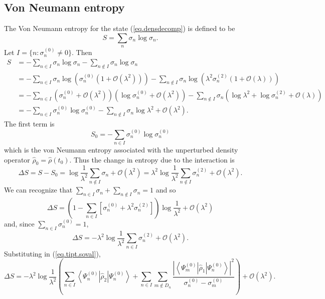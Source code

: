 \documentclass[11pt]{article}
\newcommand{\Od}[1]{\mathcal{O}{\left(#1\right)}}
\newcommand{\bra}[1]{\left\langle#1\right|}
\newcommand{\ket}[1]{\left|#1\right\rangle}
\newcommand{\op}[1]{\hat{#1}}
\theoremstyle{theorem}
\theoremstyle{remark}
\theoremstyle{step}
\theoremstyle{gap}
\begin{document}
\subsection{Von Neumann entropy}\label{sec.totalvonneumann}

The Von Neumann entropy for the state (\ref{eq.densdecomp}) is defined to be
\[
S = \sum_{n} \sigma_n \log \sigma_n.
\]
Let \(I = \{n : \sigma_n^{(0)} \neq 0\}\). Then
\begin{align*}
S &= -\sum_{n \in I} \sigma_n \log \sigma_n-\sum_{n \not\in I} \sigma_n \log \sigma_n \\
&= - \sum_{n \in I} \sigma_n \log \left(\sigma_n^{(0)} \left(1 + \Od{\lambda^2}\right)\right)  - \sum_{n \not\in I} \sigma_n \log\left(\lambda^2\sigma_n^{(2)}\left(1 + \Od{\lambda}\right)\right) \\
&= - \sum_{n \in I} \left(\sigma_n^{(0)} + \Od{\lambda^2}\right) \left(\log \sigma_n^{(0)}+\Od{\lambda^2}\right) - \sum_{n \not\in I} \sigma_n \left(\log\lambda^2+\log\sigma_n^{(2)}+ \Od{\lambda}\right) \\
&= - \sum_{n \in I} \sigma_n^{(0)} \log \sigma_n^{(0)} -\sum_{n \not\in I} \sigma_n \log\lambda^2+ \Od{\lambda^2}.
\end{align*}
The first term is
\[S_0 = - \sum_{n \in I} \sigma_n^{(0)} \log \sigma_n^{(0)}\]
which is the von Neumann entropy associated with the unperturbed density operator \(\op{\rho}_0 = \op{\rho}\left(t_0\right)\). Thus the change in entropy due to the interaction is
\begin{equation}\label{eq.entropyresultnotA}
{\Delta S = S-S_0 = \log\frac{1}{\lambda^2}\sum_{n \not\in I} \sigma_n + \Od{\lambda^2} = \lambda^2 \log\frac{1}{\lambda^2} \sum_{n \not\in I}\sigma_n^{(2)}+ \Od{\lambda^2}.}
\end{equation}
We can recognize that \(\sum_{n\in I} \sigma_n + \sum_{n \not\in I} \sigma_n = 1\) and so
\[
\Delta S = \left(1- \sum_{n\in I} \left[\sigma_n^{(0)}+\lambda^2 \sigma_n^{(2)}\right]\right)\log\frac{1}{\lambda^2} + \Od{\lambda^2}
\]
and, since \(\sum_{n \in I} \sigma_n^{(0)} = 1\),
\begin{equation}\label{eq.entropyresultwithsigma2}
{\Delta S = -\lambda^2 \log\frac{1}{\lambda^2}\sum_{n \in I} \sigma_n^{(2)} + \Od{\lambda^2}.}
\end{equation}
Substituting in (\ref{eq.tipt.soval}),
\[
\Delta S = -\lambda^2 \log\frac{1}{\lambda^2}\left(\sum_{n \in I} \bra{\Psi_n^{(0)}}\op{\rho}_2\ket{\Psi_n^{(0)}} +  \sum_{n \in I} \sum_{m \not\in D_n} \frac{\left|\bra{\Psi_m^{(0)}} \op{\rho}_1 \ket{\Psi_n^{(0)}}\right|^2}{\sigma_n^{(0)}-\sigma_m^{(0)}} \right)+ \Od{\lambda^2}.
\]
\end{document}

